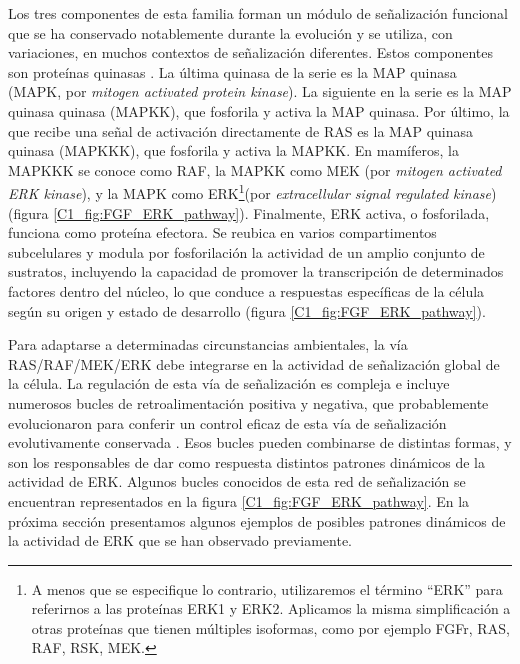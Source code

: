 \documentclass[./main.tex]{subfiles}
\begin{document}
Los tres componentes de esta familia forman un módulo de señalización funcional que se ha conservado notablemente durante la evolución y se utiliza, con variaciones, en muchos contextos de señalización diferentes. Estos componentes son proteínas quinasas \cite{Roux2004}. La última quinasa de la serie es la MAP quinasa (MAPK, por \textit{mitogen activated protein kinase}). La siguiente en la serie es la MAP quinasa quinasa (MAPKK), que fosforila y activa la MAP quinasa. Por último, la que recibe una señal de activación directamente de RAS es la MAP quinasa quinasa (MAPKKK), que fosforila y activa la MAPKK. En mamíferos, la MAPKKK se conoce como RAF, la MAPKK como MEK (por \textit{mitogen activated ERK kinase}), y la MAPK como ERK\footnote{A menos que se especifique lo contrario, utilizaremos el término ``ERK''  para referirnos a las proteínas ERK1 y ERK2. Aplicamos la misma simplificación a otras proteínas que tienen múltiples isoformas, como por ejemplo FGFr, RAS, RAF, RSK, MEK.}(por \textit{extracellular signal regulated kinase}) (figura \ref{C1_fig:FGF_ERK_pathway}). Finalmente, ERK activa, o fosforilada, funciona como proteína efectora. Se reubica en varios compartimentos subcelulares y modula por fosforilación la actividad de un amplio conjunto de sustratos, incluyendo la capacidad de promover la transcripción de determinados factores dentro del núcleo, lo que conduce a respuestas específicas de la célula según su origen y estado de desarrollo (figura \ref{C1_fig:FGF_ERK_pathway}).


Para adaptarse a determinadas circunstancias ambientales, la vía RAS/RAF/MEK/ERK debe integrarse en la actividad de señalización global de la célula. La regulación de esta vía de señalización es compleja e incluye numerosos bucles de retroalimentación positiva y negativa, que probablemente evolucionaron para conferir un control eficaz de esta vía de señalización evolutivamente conservada \cite{Lake2016,Dougherty2005,Ekerot2008,Lavoie2015,Lemmon2016,Nett2018,Sturm2010}. Esos bucles pueden combinarse de distintas formas, y son los responsables de dar como respuesta distintos patrones dinámicos de la actividad de ERK. Algunos bucles conocidos de esta red de señalización se encuentran representados en la figura \ref{C1_fig:FGF_ERK_pathway}. En la próxima sección presentamos algunos ejemplos de posibles patrones dinámicos de la actividad de ERK que se han observado previamente. 


\end{document}
